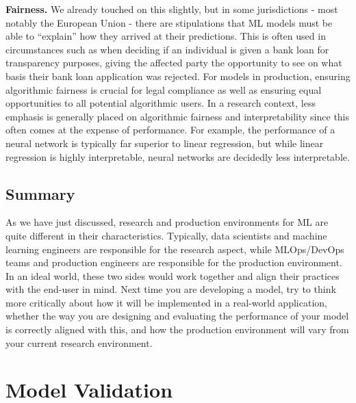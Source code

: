 {{    \textbf{Fairness.} We already touched on this slightly, but in some jurisdictions - most notably the European Union - there are stipulations that ML models must be able to “explain” how they arrived at their predictions. This is often used in circumstances such as when deciding if an individual is given a bank loan for transparency purposes, giving the affected party the opportunity to see on what basis their bank loan application was rejected. For models in production, ensuring algorithmic fairness is crucial for legal compliance as well as ensuring equal opportunities to all potential algorithmic users. In a research context, less emphasis is generally placed on algorithmic fairness and interpretability since this often comes at the expense of performance. For example, the performance of a neural network is typically far superior to linear regression, but while linear regression is highly interpretable, neural networks are decidedly less interpretable.
    
\subsection{Summary}

    As we have just discussed, research and production environments for ML are quite different in their characteristics. Typically, data scientists and machine learning engineers are responsible for the research aspect, while MLOps/DevOps teams and production engineers are responsible for the production environment. In an ideal world, these two sides would work together and align their practices with the end-user in mind. Next time you are developing a model, try to think more critically about how it will be implemented in a real-world application, whether the way you are designing and evaluating the performance of your model is correctly aligned with this, and how the production environment will vary from your current research environment. 
    
    
\section{Model Validation}

}}
